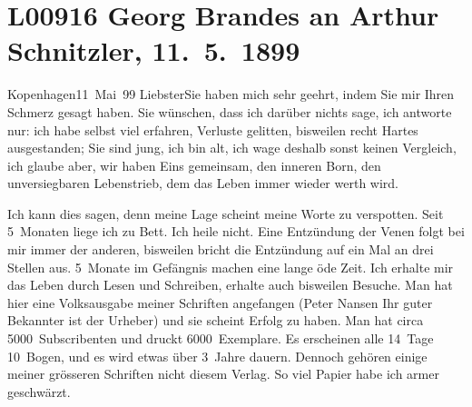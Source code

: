 

\section[Georg Brandes an Arthur Schnitzler, 11. 5. 1899]{L00916 Georg Brandes an Arthur Schnitzler, 11. 5. 1899}
\nopagebreak{}
\rehead{ }\normalsize\beginnumbering{}
\toendnotes[C]{\smallbreak\pagebreak[2]}
\toendnotes[C]{\smallbreak}
\pstart
           \raggedleft{}{\pb}Kopenhagen11 Mai 99\pend
           \vspace{0.5em}
\pstart
           Liebster\hspace*{3.5em}Sie haben mich sehr geehrt, indem Sie mir Ihren
               Schmerz gesagt haben. Sie wünschen, dass ich darüber nichts sage, ich antworte  nur: ich habe selbst viel erfahren, Verluste
               gelitten, bisweilen recht Hartes ausgestanden; Sie sind jung, ich \introOben{}bin\introOben{} alt, ich wage deshalb sonst keinen
               Vergleich, ich glaube aber, wir haben Eins gemeinsam,
               den inneren Born, den unversiegbaren Lebenstrieb, dem das Leben immer wieder werth
               wird.\pend
           
\pstart
           Ich kann dies sagen, denn meine Lage scheint meine Worte zu verspotten. Seit
               5 Monaten liege ich zu Bett. Ich heile nicht. Eine Entzündung der Venen folgt bei mir
               immer der anderen, bisweilen bricht die Entzündung auf ein Mal an drei Stellen aus.
               5 Monate im Gefängnis machen eine lange öde Zeit. Ich erhalte mir das Leben {\pb}durch Lesen und Schreiben, erhalte
               auch bisweilen Besuche. Man hat hier eine Volksausgabe meiner Schriften angefangen (Peter Nansen Ihr guter Bekannter ist der
               Urheber) und sie scheint Erfolg zu haben. Man hat circa 5000 Subscribenten und druckt
               6000 Exemplare. Es erscheinen alle 14 Tage 10 Bogen, und es wird etwas über 3 Jahre
               dauern. Dennoch gehören einige meiner grösseren Schriften nicht diesem Verlag. So
               viel Papier habe ich armer geschwärzt.\pend
           
